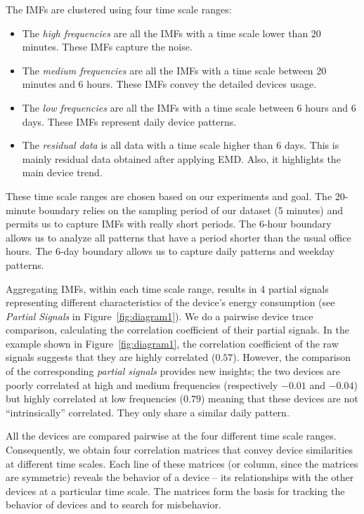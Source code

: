 The IMFs are clustered using four time scale ranges: 
\begin{itemize}
 \item The \emph{high frequencies} are all the IMFs with a time scale lower than 20 minutes. These IMFs capture the noise.
 \item The \emph{medium frequencies} are all the IMFs with a time scale between 20 minutes and 6 hours. These IMFs convey the detailed devices usage.
 \item The \emph{low frequencies} are all the IMFs with a time scale between 6 hours and 6 days. These IMFs represent daily device patterns.
 \item The \emph{residual data} is all data with a time scale higher than 6 days. This is mainly residual data obtained after applying EMD.  Also, it highlights the main device trend.
\end{itemize}

These time scale ranges are chosen based on our experiments and goal.
The 20-minute boundary relies on the sampling period of our dataset (5 minutes) and permits us to capture IMFs with really short periods.
The 6-hour boundary allows us to analyze all patterns that have a period shorter than the usual office hours.
The 6-day boundary allows us to capture daily patterns and weekday patterns.

Aggregating IMFs, within each time scale range, results in 4 partial signals representing different characteristics of the device's
 energy consumption (see \emph{Partial Signals} in Figure~\ref{fig:diagram1}).
We do a pairwise device trace comparison, calculating the correlation coefficient of their partial signals.
In the example shown in Figure~\ref{fig:diagram1}, the correlation coefficient of the raw signals suggests that they are highly correlated ($0.57$). 
However, the comparison of the corresponding \emph{partial signals} provides new insights;
the two devices are poorly correlated at high and medium frequencies (respectively $-0.01$ and $-0.04$) but highly correlated at low frequencies ($0.79$) meaning that these devices are not ``intrinsically'' correlated.  They only share a similar daily pattern.

All the devices are compared pairwise at the four different time scale ranges.
Consequently, we obtain four correlation matrices that convey device similarities at different time scales.
Each line of these matrices (or column, since the matrices are symmetric) reveals the behavior of a device -- its relationships with the 
other devices at a particular time scale.
The matrices form the basis for tracking the behavior of devices and to search for misbehavior.


